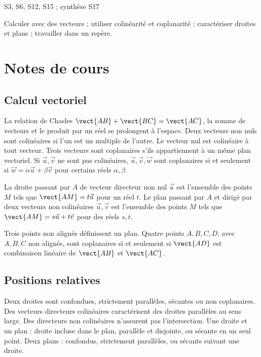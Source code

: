 \setcounter{chapter}{9}\label{ch:10}

{\small\sffamily\color{mxmint}S3, S6, S12, S15 ; synthèse S17\par}

\begin{keypoint}[Objectifs]Calculer avec des vecteurs ; utiliser colinéarité et coplanarité ; caractériser droites et plans ; travailler dans un repère.\end{keypoint}

\section{Notes de cours}
\subsection{Calcul vectoriel}
La relation de Chasles $\vect{AB}+\vect{BC}=\vect{AC}$, la somme de vecteurs et le produit par un réel se prolongent à l'espace. Deux vecteurs non nuls sont colinéaires si l'un est un multiple de l'autre. Le vecteur nul est colinéaire à tout vecteur.
Trois vecteurs sont coplanaires s'ils appartiennent à un même plan vectoriel. Si $\vec u,\vec v$ ne sont pas colinéaires, $\vec u,\vec v,\vec w$ sont coplanaires si et seulement si $\vec w=\alpha\vec u+\beta\vec v$ pour certains réels $\alpha,\beta$.
\begin{keypoint}
La droite passant par $A$ de vecteur directeur non nul $\vec u$ est l'ensemble des points $M$ tels que $\vect{AM}=t\vec u$ pour un réel $t$.
Le plan passant par $A$ et dirigé par deux vecteurs non colinéaires $\vec u,\vec v$ est l'ensemble des points $M$ tels que $\vect{AM}=s\vec u+t\vec v$ pour des réels $s,t$.
\end{keypoint}
Trois points non alignés définissent un plan. Quatre points $A,B,C,D$, avec $A,B,C$ non alignés, sont coplanaires si et seulement si $\vect{AD}$ est combinaison linéaire de $\vect{AB}$ et $\vect{AC}$.
\subsection{Positions relatives}
Deux droites sont confondues, strictement parallèles, sécantes ou non coplanaires. Des vecteurs directeurs colinéaires caractérisent des droites parallèles au sens large. Des directeurs non colinéaires n'assurent pas l'intersection.
Une droite et un plan : droite incluse dans le plan, parallèle et disjointe, ou sécante en un seul point. Deux plans : confondus, strictement parallèles, ou sécants suivant une droite.
